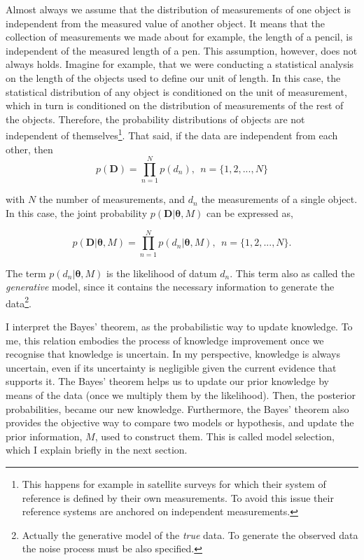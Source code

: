 Almost always we assume that the distribution of measurements of one object is independent from the measured value of another object.  It means that the collection of measurements we made about for example, the length of a pencil, is independent of the measured length of a pen. This assumption, however, does not always holds. Imagine for example, that we were conducting a statistical analysis on the length of the objects used to define our unit of length. In this case, the statistical distribution of any object is conditioned on the unit of measurement, which in turn is conditioned on the distribution of measurements of the rest of the objects. Therefore, the probability distributions of objects are not independent of themselves\footnote{This happens for example in satellite surveys for which their system of reference is defined by their own measurements. To avoid this issue their reference systems are anchored on independent measurements.}. That said, if the data are independent from each other, then
\begin{equation}
\label{eq:independence}
 p(\mathbf{D}) = \prod_{n=1}^N p(d_n), \ \ n=\{1,2,...,N\}
\end{equation}

 with $N$ the number of measurements, and $d_n$ the measurements of a single object. In this case, the joint probability  $p(\mathbf{D}|\mathbf{\theta},M)$ can be expressed as,

\begin{equation}
 p(\mathbf{D}|\mathbf{\theta},M) = \prod_{n=1}^N p(d_n|\mathbf{\theta},M), \ \ n=\{1,2,...,N\}.
\end{equation}

The term $p(d_n|\mathbf{\theta},M)$ is the likelihood of datum $d_n$. This term also as called the \emph{generative} model, since it  contains the necessary information to generate the data\footnote{Actually the generative model of the \emph{true} data. To generate the observed data the noise process must be also specified.}.

I interpret the Bayes' theorem, as the probabilistic way to update knowledge. To me, this relation embodies the process of knowledge improvement once we recognise that knowledge is uncertain. In my perspective, knowledge is always uncertain, even if its uncertainty is negligible given the current evidence that supports it. The Bayes' theorem helps us to update our prior knowledge by means of the data (once we multiply them by the likelihood). Then, the posterior probabilities, became our new knowledge. Furthermore, the Bayes' theorem also provides the objective way to compare two models or hypothesis, and update the prior information, $M$, used to construct them. This is called model selection, which I explain briefly in the next section.

